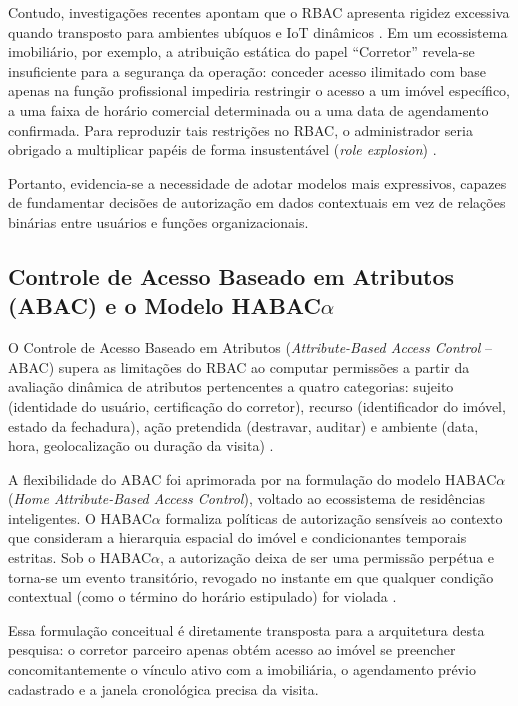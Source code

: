 Contudo, investigações recentes apontam que o RBAC apresenta rigidez excessiva quando transposto para ambientes ubíquos e IoT dinâmicos \cite{ameer2022, surveysmarthomeauth2021}. Em um ecossistema imobiliário, por exemplo, a atribuição estática do papel ``Corretor'' revela-se insuficiente para a segurança da operação: conceder acesso ilimitado com base apenas na função profissional impediria restringir o acesso a um imóvel específico, a uma faixa de horário comercial determinada ou a uma data de agendamento confirmada. Para reproduzir tais restrições no RBAC, o administrador seria obrigado a multiplicar papéis de forma insustentável (\textit{role explosion}) \cite{ameer2022}.

Portanto, evidencia-se a necessidade de adotar modelos mais expressivos, capazes de fundamentar decisões de autorização em dados contextuais em vez de relações binárias entre usuários e funções organizacionais.

\subsection{Controle de Acesso Baseado em Atributos (ABAC) e o Modelo \texorpdfstring{HABAC$\alpha$}{HABAC-Alpha}}
\label{subsec:abac}

O Controle de Acesso Baseado em Atributos (\textit{Attribute-Based Access Control} -- ABAC) supera as limitações do RBAC ao computar permissões a partir da avaliação dinâmica de atributos pertencentes a quatro categorias: sujeito (identidade do usuário, certificação do corretor), recurso (identificador do imóvel, estado da fechadura), ação pretendida (destravar, auditar) e ambiente (data, hora, geolocalização ou duração da visita) \cite{ameer2022, continuousauth2022}.

A flexibilidade do ABAC foi aprimorada por  na formulação do modelo HABAC$\alpha$ (\textit{Home Attribute-Based Access Control}), voltado ao ecossistema de residências inteligentes. O HABAC$\alpha$ formaliza políticas de autorização sensíveis ao contexto que consideram a hierarquia espacial do imóvel e condicionantes temporais estritas. Sob o HABAC$\alpha$, a autorização deixa de ser uma permissão perpétua e torna-se um evento transitório, revogado no instante em que qualquer condição contextual (como o término do horário estipulado) for violada \cite{ameer2022}.

Essa formulação conceitual é diretamente transposta para a arquitetura desta pesquisa: o corretor parceiro apenas obtém acesso ao imóvel se preencher concomitantemente o vínculo ativo com a imobiliária, o agendamento prévio cadastrado e a janela cronológica precisa da visita.

